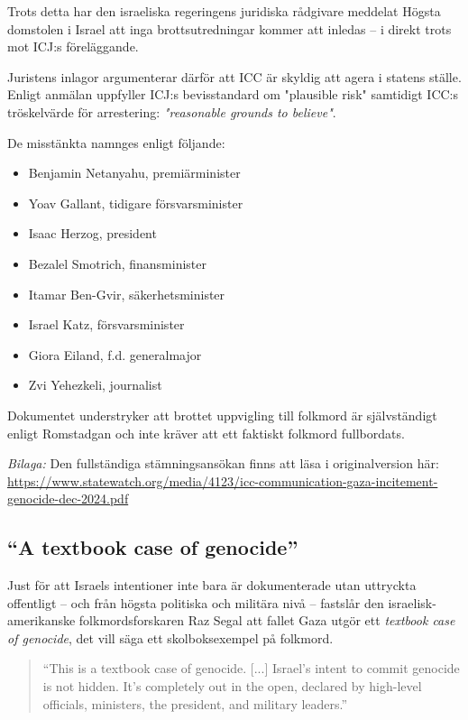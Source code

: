 Trots detta har den israeliska regeringens juridiska rådgivare meddelat Högsta domstolen i Israel att inga brottsutredningar kommer att inledas – i direkt trots mot ICJ:s föreläggande.

Juristens inlagor argumenterar därför att ICC är skyldig att agera i statens ställe. Enligt anmälan uppfyller ICJ:s bevisstandard om "plausible risk" samtidigt ICC:s tröskelvärde för arrestering: \textit{"reasonable grounds to believe"}.

De misstänkta namnges enligt följande:

\begin{itemize}
  \item Benjamin Netanyahu, premiärminister
  \item Yoav Gallant, tidigare försvarsminister
  \item Isaac Herzog, president
  \item Bezalel Smotrich, finansminister
  \item Itamar Ben-Gvir, säkerhetsminister
  \item Israel Katz, försvarsminister
  \item Giora Eiland, f.d. generalmajor
  \item Zvi Yehezkeli, journalist
\end{itemize}

Dokumentet understryker att brottet uppvigling till folkmord är självständigt enligt Romstadgan och inte kräver att ett faktiskt folkmord fullbordats.

\textit{Bilaga:} Den fullständiga stämningsansökan finns att läsa i originalversion här: \url{https://www.statewatch.org/media/4123/icc-communication-gaza-incitement-genocide-dec-2024.pdf}


\subsection{“A textbook case of genocide”}

Just för att Israels intentioner inte bara är dokumenterade utan uttryckta offentligt – och från högsta politiska och militära nivå – fastslår den israelisk-amerikanske folkmordsforskaren Raz Segal att fallet Gaza utgör ett \textit{textbook case of genocide}, det vill säga ett skolboksexempel på folkmord.

\begin{quote}
“This is a textbook case of genocide. [...] Israel’s intent to commit genocide is not hidden. It’s completely out in the open, declared by high-level officials, ministers, the president, and military leaders.”
\end{quote}

